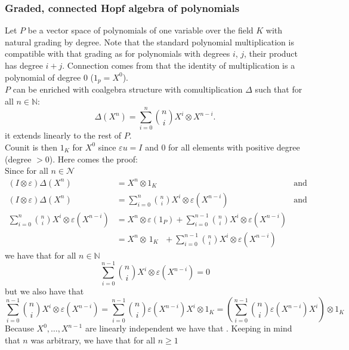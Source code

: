 \documentclass[a4paper, 12pt]{article}
\begin{document}
\subsubsection{Graded, connected Hopf algebra of polynomials}
Let $P$ be a vector space of polynomials of one variable over the field $K$ with natural grading by degree.
Note that the standard polynomial multiplication is compatible with that grading as for polynomials with
degrees $i$, $j$, their product has degree $i + j$. Connection comes from that the identity of
multiplication
is a polynomial of degree $0$ ($1_p = X^0$).  \\
$P$ can be enriched with coalgebra structure with comultiplication $\Delta$ such that for all
$n \in \mathbb{N}$:
\begin{equation*}
\Delta(X^n) = \sum^n_{i = 0} \binom{n}{i} X^i \otimes X^{n-i}.
\end{equation*}
it extends linearly to the rest of $P$. \\
Counit is then $1_K$ for $X^0$ since $\varepsilon u = I$ and
$0$ for all elements with positive degree (degree $>0$). Here comes the proof: \\
Since for all $n \in \mathcal{N}$
\begin{align*}
(I \otimes \varepsilon )\Delta(X^n) &= X^n \otimes 1_K &\mathrm{and} \\
(I \otimes \varepsilon )\Delta(X^n) &= \sum^n_{i = 0}\binom{n}{i} X^i \otimes \varepsilon(X^{n-i}) &\mathrm{and} \\
\sum^n_{i = 0}\binom{n}{i} X^i \otimes \varepsilon(X^{n-i}) &= X^n \otimes \varepsilon(1_P) +
\sum^{n-1}_{i=0}\binom{n}{i} X^i \otimes \varepsilon(X^{n-i}) \\ &=
X^n \otimes \, 1_K \ \ \ + \sum^{n-1}_{i=0}\binom{n}{i} X^i \otimes \varepsilon(X^{n-i})
\end{align*}
we have that for all $n \in \mathbb{N}$
\begin{equation*}
\sum^{n-1}_{i=0}\binom{n}{i} X^i \otimes \varepsilon(X^{n-i}) = 0
\end{equation*}
but we also have that
\begin{equation*}
\sum^{n-1}_{i=0}\binom{n}{i} X^i \otimes \varepsilon(X^{n-i}) = \sum^{n-1}_{i=0}\binom{n}{i}
 \varepsilon(X^{n-i})X^i \otimes 1_K =
\left( \sum^{n-1}_{i=0}\binom{n}{i} \varepsilon(X^{n-i})X^i \right)\otimes 1_K
\end{equation*}
Because $X^0, \dots, X^{n-1}$ are linearly independent we have that . Keeping in mind that $n$ was arbitrary, we have that for all $n \geq 1$
\end{document}
